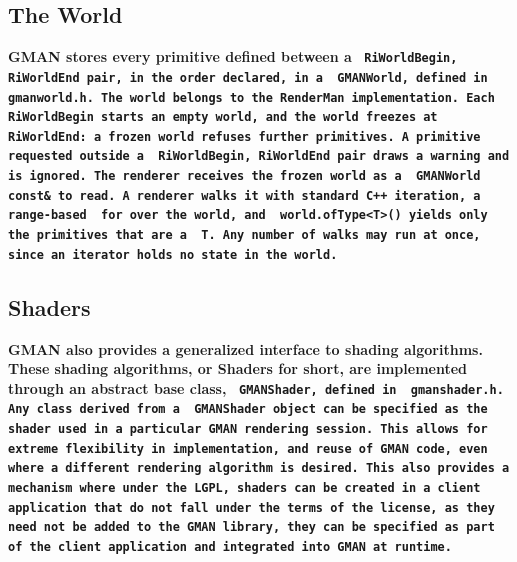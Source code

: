 \documentclass{book}	%
\def\gman{\bf GMAN \rm}
\def\text#1{\bf\tt #1 \rm}
\begin{document}
\subsection{The World}
\gman stores every primitive defined between a \text{ RiWorldBegin,
RiWorldEnd } pair, in the order declared, in a \text{ GMANWorld, }
defined in \text{ gmanworld.h. }  The world belongs to the RenderMan
implementation.  Each \text{ RiWorldBegin } starts an empty world, and
the world freezes at \text{ RiWorldEnd: } a frozen world refuses further
primitives.  A primitive requested outside a \text{ RiWorldBegin,
RiWorldEnd } pair draws a warning and is ignored.  The renderer receives
the frozen world as a \text{ GMANWorld const\& } to read.  A renderer
walks it with standard C++ iteration, a range-based \text{ for } over
the world, and \text{ world.ofType<T>() } yields only the primitives
that are a \text{ T. }  Any number of walks may run at once, since an
iterator holds no state in the world.

\subsection{Shaders}
\gman also provides a generalized interface to shading algorithms.
These shading algorithms, or Shaders for short, are implemented
through an abstract base class, \text { GMANShader, } defined in \text
{ gmanshader.h. }  Any class derived from a \text { GMANShader } object can
be specified as the shader used in a particular GMAN rendering
session.  This allows for extreme flexibility in implementation, and
reuse of \gman code, even where a different rendering algorithm is
desired.  This also provides a mechanism where under the LGPL, shaders
can be created in a client application that do not fall under the
terms of the license, as they need not be added to the \gman library,
they can be specified as part of the client application and integrated
into \gman at runtime.
\end{document}
